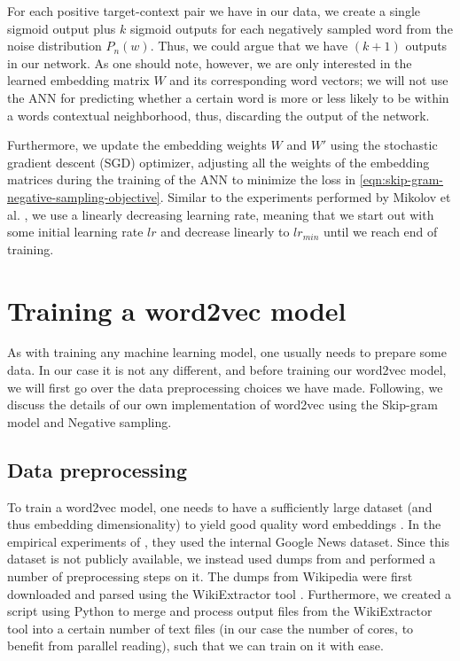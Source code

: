 For each positive target-context pair we have in our data, we create a single sigmoid output plus $k$ sigmoid outputs for each negatively sampled word from the noise distribution $P_n(w)$. Thus, we could argue that we have $(k + 1)$ outputs in our network. As one should note, however, we are only interested in the learned embedding matrix $W$ and its corresponding word vectors; we will not use the ANN for predicting whether a certain word is more or less likely to be within a words contextual neighborhood, thus, discarding the output of the network.


Furthermore, we update the embedding weights $W$ and $W'$ using the stochastic gradient descent (SGD) optimizer, adjusting all the weights of the embedding matrices during the training of the ANN to minimize the loss in \cref{eqn:skip-gram-negative-sampling-objective}. Similar to the experiments performed by Mikolov et al. \cite{mikolov2013a}, we use a linearly decreasing learning rate, meaning that we start out with some initial learning rate $lr$ and decrease linearly to $lr_{min}$ until we reach end of training.

\section{Training a word2vec model}
As with training any machine learning model, one usually needs to prepare some data. In our case it is not any different, and before training our word2vec model, we will first go over the data preprocessing choices we have made. Following, we discuss the details of our own implementation of word2vec using the Skip-gram model and Negative sampling.

\subsection{Data preprocessing}
\label{sec:data-preprocessing}
To train a word2vec model, one needs to have a sufficiently large dataset (and thus embedding dimensionality) to yield good quality word embeddings \cite{mikolov2013b}. In the empirical experiments of \cite{mikolov2013b}, they used the internal Google News dataset. Since this dataset is not publicly available, we instead used dumps from \cite{WikimediaDumps} and performed a number of preprocessing steps on it. The dumps from Wikipedia were first downloaded and parsed using the WikiExtractor tool \cite{Wikiextractor2015}. Furthermore, we created a script using Python \cite{python3-2009} to merge and process output files from the WikiExtractor tool into a certain number of text files (in our case the number of cores, to benefit from parallel reading), such that we can train on it with ease.


